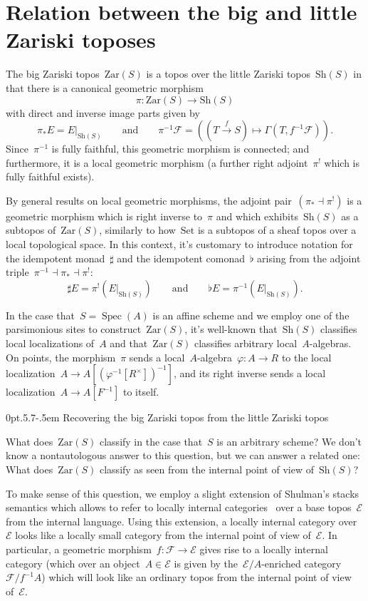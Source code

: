 \documentclass[10pt,reqno,a4paper]{amsbook}
\makeatletter
\theoremstyle{definition}
\theoremstyle{plain}
\theoremstyle{remark}
\newcommand{\E}{\mathcal{E}}
\newcommand{\F}{\mathcal{F}}
\newcommand{\Set}{\mathrm{Set}}
\newcommand{\Sh}{\mathrm{Sh}}
\newcommand{\Zar}{\mathrm{Zar}}
\DeclareMathOperator{\Spec}{Spec}
\newcommand{\?}{\,{:}\,}
\renewcommand{\_}{\mathpunct{.}\,}
\newcommand{\xra}{\xrightarrow}
\def\subsection{\@startsection{subsection}{2}%
  {0pt}{.5\linespacing\@plus.7\linespacing}{-.5em}%
  {\normalfont\bfseries}}
\makeatother
\begin{document}
\section{Relation between the big and little Zariski toposes}
\label{sect:relation-big-little}

The big Zariski topos~$\Zar(S)$ is a topos over the little Zariski
topos~$\Sh(S)$ in that there is a canonical geometric morphism
\[ \pi : \Zar(S) \longrightarrow \Sh(S) \]
with direct and inverse image parts given by
\[ \pi_*E = E|_{\Sh(S)} \qquad\text{and}\qquad
  \pi^{-1}\F = ((T \xra{f} S) \mapsto \Gamma(T, f^{-1}\F)). \]
Since~$\pi^{-1}$ is fully faithful, this geometric morphism is connected; and
furthermore, it is a local geometric morphism (a further right adjoint~$\pi^!$
which is fully faithful exists).

By general results on local geometric morphisms, the adjoint pair~$(\pi_*
\dashv \pi^!)$ is a geometric morphism which is right inverse to~$\pi$ and
which exhibits~$\Sh(S)$ as a subtopos of~$\Zar(S)$, similarly to how~$\Set$ is
a subtopos of a sheaf topos over a local topological space. In this context,
it's customary to introduce notation for the idempotent monad~$\sharp$ and the
idempotent comonad~$\flat$ arising from the adjoint triple~$\pi^{-1} \dashv
\pi_* \dashv \pi^!$:
\[ \sharp E = \pi^!(E|_{\Sh(S)}) \qquad\text{and}\qquad
  \flat E = \pi^{-1}(E|_{\Sh(S)}). \]

In the case that~$S = \Spec(A)$ is an affine scheme and we employ
one of the parsimonious sites to construct~$\Zar(S)$, it's well-known
that~$\Sh(S)$ classifies local localizations of~$A$ and that~$\Zar(S)$ classifies
arbitrary local~$A$-algebras. On points, the morphism~$\pi$ sends a
local~$A$-algebra~$\varphi : A \to R$ to the local localization~$A \to
A[(\varphi^{-1}[R^\times])^{-1}]$, and its right inverse sends a local
localization~$A \to A[F^{-1}]$ to itself.


\subsection{Recovering the big Zariski topos from the little Zariski topos}

What does~$\Zar(S)$ classify in the case that~$S$ is an arbitrary scheme?
We don't know a nontautologous answer to this question, but we can answer a
related one: What does~$\Zar(S)$ classify as seen from the internal point of
view of~$\Sh(S)$?

To make sense of this question, we employ a slight extension of Shulman's
stacks semantics which allows to refer to locally internal
categories~\cite{penon:locally-internal-categories} over a base topos~$\E$ from
the internal language. Using this extension, a locally internal category
over~$\E$ looks like a locally small category from the internal point of view
of~$\E$. In particular, a geometric morphism~$f : \F \to \E$ gives rise to a
locally internal category (which over an object~$A \in \E$ is given by
the~$\E/A$-enriched category~$\F/f^{-1}A$) which will look like an ordinary
topos from the internal point of view of~$\E$.
\end{document}
